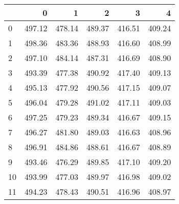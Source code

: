 \begin{tabular}{lrrrrr}
\toprule
{} &       0 &       1 &       2 &       3 &       4 \\
\midrule
0  &  497.12 &  478.14 &  489.37 &  416.51 &  409.24 \\
1  &  498.36 &  483.36 &  488.93 &  416.60 &  408.99 \\
2  &  497.10 &  484.14 &  487.31 &  416.69 &  408.90 \\
3  &  493.39 &  477.38 &  490.92 &  417.40 &  409.13 \\
4  &  495.13 &  477.92 &  490.56 &  417.15 &  409.07 \\
5  &  496.04 &  479.28 &  491.02 &  417.11 &  409.03 \\
6  &  497.25 &  479.23 &  489.34 &  416.67 &  409.15 \\
7  &  496.27 &  481.80 &  489.03 &  416.63 &  408.96 \\
8  &  496.91 &  484.86 &  488.61 &  416.67 &  408.89 \\
9  &  493.46 &  476.29 &  489.85 &  417.10 &  409.20 \\
10 &  493.99 &  477.03 &  489.97 &  416.98 &  409.02 \\
11 &  494.23 &  478.43 &  490.51 &  416.96 &  408.97 \\
\bottomrule
\end{tabular}
